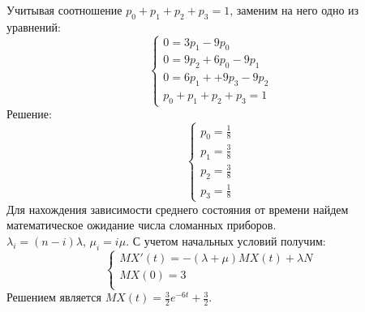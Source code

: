 \documentclass [a4paper,12pt]{article}
\begin{document}
Учитывая соотношение $p_0 + p_1 + p_2 + p_3 = 1$, заменим на него одно из уравнений:
\begin{equation*}
\begin{cases}
0 = 3p_1 - 9p_0
\\
0 = 9p_2 + 6p_0 - 9p_1
\\
0 = 6p_1 + + 9p_3 - 9p_2
\\
p_0 + p_1 + p_2 + p_3 = 1
\end{cases}
\end{equation*}
Решение:
\begin{equation*}
\begin{cases}
p_0 = \frac{1}{8}
\\
p_1 = \frac{3}{8}
\\
p_2 = \frac{3}{8}
\\
p_3 = \frac{1}{8}
\end{cases}
\end{equation*}
Для нахождения зависимости среднего состояния от времени найдем математическое ожидание числа сломанных приборов.\\
$\lambda_i = (n-i){\lambda}$, $\mu_i = i{\mu}$. С учетом начальных условий получим:\\
\begin{equation*}
\begin{cases}
MX'(t) = -(\lambda + \mu)MX(t) + {\lambda}N
\\
MX(0) = 3
\\
\end{cases}
\end{equation*}
Решением является $MX(t) = \frac{3}{2}e^{-6t}+\frac{3}{2}$.
\end{document}
